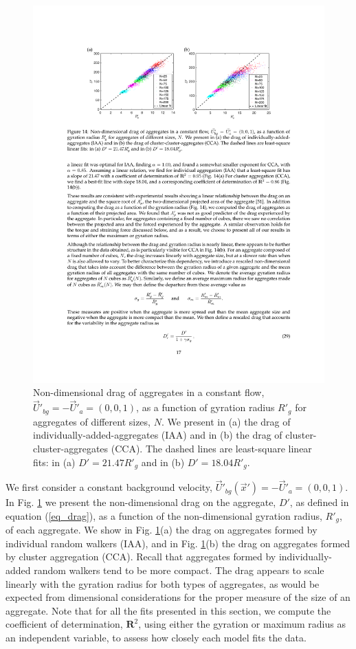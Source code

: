 \begin{figure}[ht]
	\begin{center}
		\includegraphics[scale = 1.0]{./figures/fig_drag_allprime.pdf}
	\end{center}
	\caption{Non-dimensional drag of aggregates in a constant flow, $\vec{U}'_{bg} = -\vec{U}'_a = (0,0,1)$, as a function of gyration radius $R'_g$ for aggregates of different sizes, $N$. We present in (a) the drag of individually-added-aggregates (IAA) and in (b) the drag of cluster-cluster-aggregates (CCA). The dashed lines are least-square linear fits: in (a) $D' = 21.47 R'_g$ and in (b) $D' =18.04 R'_g$.}
	\label{fig_drag_raw}
\end{figure}

We first consider a constant background velocity, $\vec{U}'_{bg}(\vec{x}') = -\vec{U}'_a=(0,0,1)$. In Fig. \ref{fig_drag_raw} we present the non-dimensional drag on the aggregate, $D'$, as defined in equation (\ref{eq_drag}),
 as a function of the non-dimensional gyration radius, $R'_g$, of each aggregate. We show in Fig. \ref{fig_drag_raw}(a) the drag on aggregates formed by individual random walkers (IAA), and in Fig. \ref{fig_drag_raw}(b) the drag on aggregates formed by cluster aggregation (CCA).
 Recall that  aggregates formed by individually-added random walkers tend to be more compact.
The drag appears to scale linearly with the gyration radius for both types of aggregates, as would be expected from dimensional considerations for the proper measure of the size of an aggregate. 
Note that for all the fits presented in this section, we compute the coefficient of determination, $\mathbf{R}^2$, using either the gyration or maximum radius as an independent variable, to assess how closely each model fits the data. 

